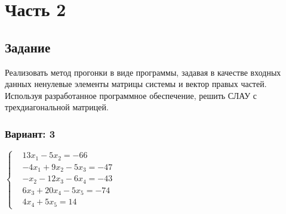 
\chapter*{Часть 2}

\section*{Задание}
Реализовать метод прогонки в виде программы, задавая в качестве входных данных
ненулевые элементы матрицы системы и вектор правых частей. Используя разработанное
программное обеспечение, решить СЛАУ с трехдиагональной матрицей.

\subsection*{Вариант: 3}


$\left\{\begin{aligned}
    & 13x_1 - 5x_2 = -66 \\
    & -4x_1 + 9x_2 - 5x_3 = -47 \\
    & -x_2 - 12x_3 - 6x_4 = -43 \\
    & 6x_3 + 20x_4 - 5x_5 = -74 \\
    & 4x_4 + 5x_5 = 14
\end{aligned}\right.$

\pagebreak